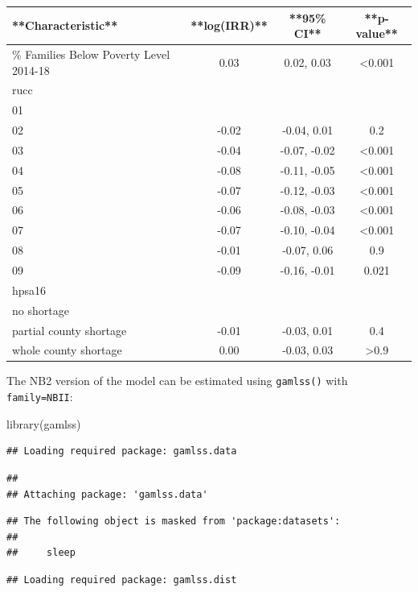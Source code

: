 \documentclass[
]{article}
\newenvironment{Shaded}{\begin{snugshade}}{\end{snugshade}}
\newcommand{\FunctionTok}[1]{\textcolor[rgb]{0.00,0.00,0.00}{#1}}
\newcommand{\NormalTok}[1]{#1}
\begin{document}
\begin{tabular}{l|c|c|c}
\hline
**Characteristic** & **log(IRR)** & **95\% CI** & **p-value**\\
\hline
\% Families Below Poverty Level 2014-18 & 0.03 & 0.02, 0.03 & <0.001\\
\hline
rucc &  &  & \\
\hline
01 &  &  & \\
\hline
02 & -0.02 & -0.04, 0.01 & 0.2\\
\hline
03 & -0.04 & -0.07, -0.02 & <0.001\\
\hline
04 & -0.08 & -0.11, -0.05 & <0.001\\
\hline
05 & -0.07 & -0.12, -0.03 & <0.001\\
\hline
06 & -0.06 & -0.08, -0.03 & <0.001\\
\hline
07 & -0.07 & -0.10, -0.04 & <0.001\\
\hline
08 & -0.01 & -0.07, 0.06 & 0.9\\
\hline
09 & -0.09 & -0.16, -0.01 & 0.021\\
\hline
hpsa16 &  &  & \\
\hline
no shortage &  &  & \\
\hline
partial county shortage & -0.01 & -0.03, 0.01 & 0.4\\
\hline
whole county shortage & 0.00 & -0.03, 0.03 & >0.9\\
\hline
\end{tabular}

The NB2 version of the model can be estimated using \texttt{gamlss()} with \texttt{family=NBII}:

\begin{Shaded}
\begin{Highlighting}[]
\FunctionTok{library}\NormalTok{(gamlss)}
\end{Highlighting}
\end{Shaded}

\begin{verbatim}
## Loading required package: gamlss.data
\end{verbatim}

\begin{verbatim}
## 
## Attaching package: 'gamlss.data'
\end{verbatim}

\begin{verbatim}
## The following object is masked from 'package:datasets':
## 
##     sleep
\end{verbatim}

\begin{verbatim}
## Loading required package: gamlss.dist
\end{verbatim}
\end{document}
